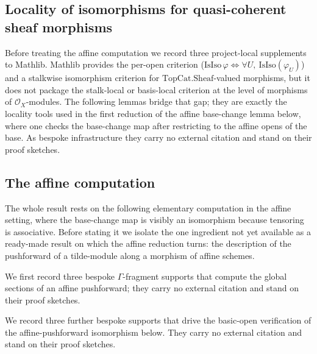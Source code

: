 \subsection{Locality of isomorphisms for quasi-coherent sheaf morphisms}

Before treating the affine computation we record three project-local supplements
to Mathlib. Mathlib provides the per-open criterion
(\(\mathrm{IsIso}\,\varphi \iff \forall U,\ \mathrm{IsIso}(\varphi_U)\)) and a
stalkwise isomorphism criterion for \(\mathrm{TopCat.Sheaf}\)-valued morphisms, but
it does not package the stalk-local or basis-local criterion at the level of
morphisms of \(\mathcal{O}_X\)-modules. The following lemmas bridge that gap; they
are exactly the locality tools used in the first reduction of the affine
base-change lemma below, where one checks the base-change map after restricting to
the affine opens of the base. As bespoke infrastructure they carry no external
citation and stand on their proof sketches.


\subsection{The affine computation}

The whole result rests on the following elementary computation in the affine
setting, where the base-change map is visibly an isomorphism because tensoring is
associative. Before stating it we isolate the one ingredient not yet available as
a ready-made result on which the affine reduction turns: the description of the
pushforward of a tilde-module along a morphism of affine schemes.

We first record three bespoke \(\Gamma\)-fragment supports that compute the global
sections of an affine pushforward; they carry no external citation and stand on
their proof sketches.


We record three further bespoke supports that drive the basic-open verification of
the affine-pushforward isomorphism below. They carry no external citation and stand
on their proof sketches.


